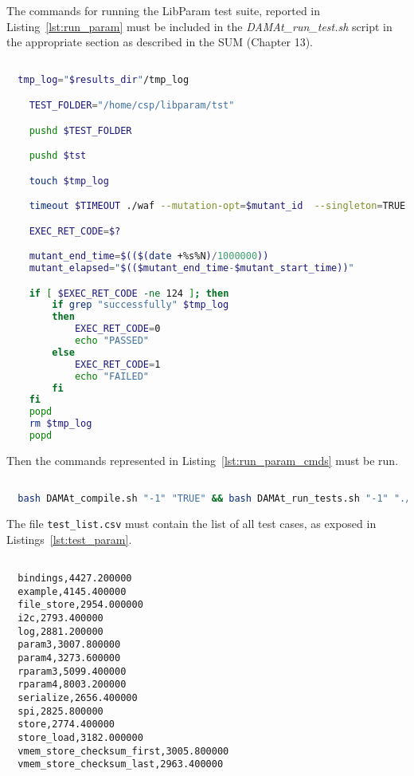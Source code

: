The commands for running the LibParam test suite, reported in Listing~\ref{lst:run_param} must be included in the \emph{DAMAt\_run\_test.sh} script in the appropriate section as described in the SUM (Chapter 13).


  \begin{lstlisting}[language=bash, label={lst:run_param}]

  tmp_log="$results_dir"/tmp_log

    TEST_FOLDER="/home/csp/libparam/tst"

    pushd $TEST_FOLDER

    pushd $tst

    touch $tmp_log

    timeout $TIMEOUT ./waf --mutation-opt=$mutant_id  --singleton=TRUE 2>&1 | tee $tmp_log

    EXEC_RET_CODE=$?

    mutant_end_time=$(($(date +%s%N)/1000000))
    mutant_elapsed="$(($mutant_end_time-$mutant_start_time))"

    if [ $EXEC_RET_CODE -ne 124 ]; then
        if grep "successfully" $tmp_log
        then
            EXEC_RET_CODE=0
            echo "PASSED"
        else
            EXEC_RET_CODE=1
            echo "FAILED"
        fi
    fi
    popd
    rm $tmp_log
    popd

  \end{lstlisting}

Then the commands represented in Listing~\ref{lst:run_param_cmds} must be run.


  \begin{lstlisting}[language=bash, label={lst:run_param_cmds}]

  bash DAMAt_compile.sh "-1" "TRUE" && bash DAMAt_run_tests.sh "-1" "./test_list.csv" "./"

  \end{lstlisting}

The file \texttt{test\_list.csv} must contain the list of all test cases, as exposed in Listings~\ref{lst:test_param}.

  \begin{lstlisting}[label={lst:test_param}]

  bindings,4427.200000
  example,4145.400000
  file_store,2954.000000
  i2c,2793.400000
  log,2881.200000
  param3,3007.800000
  param4,3273.600000
  rparam3,5099.400000
  rparam4,8003.200000
  serialize,2656.400000
  spi,2825.800000
  store,2774.400000
  store_load,3182.000000
  vmem_store_checksum_first,3005.800000
  vmem_store_checksum_last,2963.400000

  \end{lstlisting}

